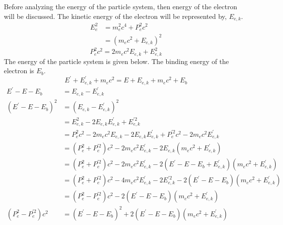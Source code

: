 Before analyzing the energy of the particle system, then energy of the 
electron will be discussed. The kinetic energy of the electron will be
represented by, $E_{e,k}$.
\begin{align}
  E_e^2 & = m_e^2c^4 + P_e^2c^2 \nonumber \\
  & = \left(m_ec^2 + E_{e,k}\right)^2 \nonumber
\end{align}
\begin{equation}
  P_e^2c^2 = 2m_ec^2E_{e,k} + E_{e,k}^2
\end{equation}
The energy of the particle system is given below. The binding energy of the 
electron is $E_b$.
\begin{equation*}
  E^{'} + E_{e,k}^{'} + m_ec^2 = E + E_{e,k} + m_ec^2 + E_b
\end{equation*}
\begin{align}
  E^{'}-E-E_b & = E_{e,k} - E_{e,k}^{'} \nonumber \\
  \left(E^{'}-E-E_b\right)^2 & = \left(E_{e,k} - E_{e,k}^{'}\right)^2 \nonumber \\
  & = E_{e,k}^2 - 2E_{e,k}E_{e,k}^{'} + E_{e,k}^{'2} \nonumber \\
  & = P_e^2c^2 - 2m_ec^2E_{e,k} - 2E_{e,k}E_{e,k}^{'} + P_e^{'2}c^2 - 2m_ec^2E_{e,k}^{'}
  \nonumber \\
  & = \left(P_e^2 + P_e^{'2}\right)c^2 - 2m_ec^2E_{e,k}^{'} - 
  2E_{e,k}\left(m_ec^2 + E_{e,k}^{'}\right) \nonumber \\
  & = \left(P_e^2 + P_e^{'2}\right)c^2 - 2m_ec^2E_{e,k}^{'} - 
  2\left(E^{'}-E-E_b+E_{e,k}^{'}\right)\left(m_ec^2 + E_{e,k}^{'}\right) \nonumber\\
  & = \left(P_e^2 + P_e^{'2}\right)c^2 - 4m_ec^2E_{e,k}^{'} - 2E_{e,k}^{'2} -
  2\left(E^{'}-E-E_b\right)\left(m_ec^2 + E_{e,k}^{'}\right) \nonumber \\
  & = \left(P_e^2 - P_e^{'2}\right)c^2 -
  2\left(E^{'}-E-E_b\right)\left(m_ec^2 + E_{e,k}^{'}\right) \nonumber \\
  \left(P_e^2 - P_e^{'2}\right)c^2 & = \left(E^{'}-E-E_b\right)^2 +
  2\left(E^{'}-E-E_b\right)\left(m_ec^2 + E_{e,k}^{'}\right)
\end{align}

